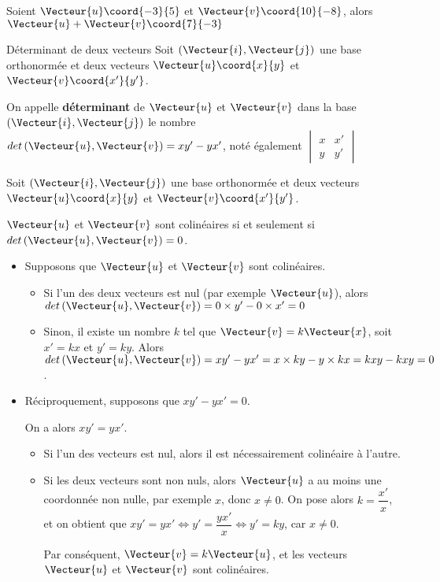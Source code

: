 \documentclass[a4paper]{article}
\begin{document}
\begin{example}{}{}
  Soient $\Vecteur{u}\coord{-3}{5}$  et $\Vecteur{v}\coord{10}{-8}$, alors $\Vecteur{u}+\Vecteur{v}\coord{7}{-3}$
\end{example}


\begin{definition}{Déterminant de deux vecteurs}{}
Soit $\left(\Vecteur{i},\Vecteur{j}\right)$ une base orthonormée et deux vecteurs $\Vecteur{u}\coord{x}{y}$ et $\Vecteur{v}\coord{x'}{y'}$.

On appelle \textbf{déterminant} de $\Vecteur{u}$ et $\Vecteur{v}$ dans la base $\left(\Vecteur{i},\Vecteur{j}\right)$ le nombre $det\left(\Vecteur{u},\Vecteur{v}\right)=xy'-yx'$, noté également 
$\begin{vmatrix} 
  x & x' \\ 
  y & y' 
  \end{vmatrix} $
\end{definition}

\begin{propriete}{}{}
  Soit $\left(\Vecteur{i},\Vecteur{j}\right)$ une base orthonormée et deux vecteurs $\Vecteur{u}\coord{x}{y}$ et $\Vecteur{v}\coord{x'}{y'}$.

  $\Vecteur{u}$ et $\Vecteur{v}$ sont colinéaires si et seulement si $det\left(\Vecteur{u},\Vecteur{v}\right)=0$.
\end{propriete}

\begin{demonstrationp}{}{}
  \begin{itemize}
    \item Supposons que $\Vecteur{u}$ et $\Vecteur{v}$ sont colinéaires.
    \begin{itemize}
      \item Si l'un des deux vecteurs est nul (par exemple $\Vecteur{u}$), alors $det\left(\Vecteur{u},\Vecteur{v}\right)=0\times y'-0 \times x'=0$
      \item Sinon, il existe un nombre $k$ tel que $\Vecteur{v}=k\Vecteur{x}$, soit $x'=kx$ et $y'=ky$. Alors $det\left(\Vecteur{u},\Vecteur{v}\right)=xy'-yx'=x\times ky-y\times kx=kxy-kxy=0$.
    \end{itemize}

    \item Réciproquement, supposons que $xy'-yx'=0$.
    
    On a alors $xy'=yx'$. 
    \begin{itemize}
      \item Si l'un des vecteurs est nul, alors il est nécessairement colinéaire à l'autre.
      \item Si les deux vecteurs sont non nuls, alors $\Vecteur{u}$ a au moins une coordonnée non nulle, par exemple $x$, donc $x\neq0$.
        On pose alors $k=\dfrac{x'}{x}$, et on obtient que $xy'=yx' \iff y'=\dfrac{yx'}{x} \iff y'=ky$, car $x\neq 0$.

        Par conséquent, $\Vecteur{v}=k\Vecteur{u}$, et les vecteurs $\Vecteur{u}$ et $\Vecteur{v}$ sont colinéaires.
    \end{itemize}
  \end{itemize}

\end{demonstrationp}
\end{document}
